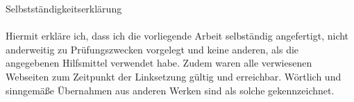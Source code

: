 \newpage
\Large{Selbstständigkeitserklärung}\\
\\
\small Hiermit erkläre ich,
dass ich die vorliegende Arbeit selbständig angefertigt,
nicht anderweitig zu Prüfungszwecken vorgelegt und keine anderen,
als die angegebenen Hilfsmittel verwendet habe.
Zudem waren alle verwiesenen Webseiten zum Zeitpunkt der Linksetzung gültig und erreichbar.
Wörtlich und sinngemäße Übernahmen aus anderen Werken sind als solche gekennzeichnet.
\\
\newpage
